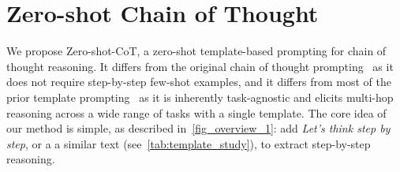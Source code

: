 \documentclass{article}
\newcommand{\mr}[1]{{\color{teal}[{#1} --MR]}}
\newcommand{\sg}[1]{{\color{orange}[{#1} --SG]}}
\newcommand{\yi}[1]{{\color{magenta}[{#1} --YI]}}
\newcommand{\CoT}{chain of thought\xspace}
\newcommand{\ours}{Zero-shot-CoT\xspace}
\begin{document}



\section{Zero-shot Chain of Thought}
\label{sec:proposal}


We propose \ours, a zero-shot template-based prompting for \CoT reasoning. 
It differs from the original \CoT prompting~\citep{cot_wei} as it does not require step-by-step few-shot examples, and it differs from most of the prior template prompting~\citep{liu2021pre} as it is inherently task-agnostic and elicits multi-hop reasoning across a wide range of tasks with a single template. The core idea of our method is simple, as described in~\autoref{fig_overview_1}: add \textit{Let's think step by step}, or a a similar text (see~\autoref{tab:template_study}), to extract step-by-step reasoning.

\end{document}
